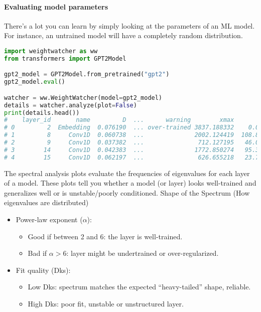 \paragraph{Evaluating model parameters}

There's a lot you can learn by simply looking at the parameters of an ML model. For instance, an untrained model will have a completely random distribution. 

\begin{lstlisting}[language=Python]
import weightwatcher as ww
from transformers import GPT2Model

gpt2_model = GPT2Model.from_pretrained("gpt2")
gpt2_model.eval()

watcher = ww.WeightWatcher(model=gpt2_model)
details = watcher.analyze(plot=False)
print(details.head())
#    layer_id       name         D  ...      warning        xmax        xmin
# 0         2  Embedding  0.076190  ... over-trained 3837.188332    0.003564
# 1         8     Conv1D  0.060738  ...              2002.124419  108.881419
# 2         9     Conv1D  0.037382  ...               712.127195   46.092445
# 3        14     Conv1D  0.042383  ...              1772.850274   95.358278
# 4        15     Conv1D  0.062197  ...               626.655218   23.727908

\end{lstlisting}
 
The spectral analysis plots evaluate the frequencies of eigenvalues for each layer of a model. These plots tell you whether a model (or layer) looks well-trained and generalizes well or is unstable/poorly conditioned.
Shape of the Spectrum (How eigenvalues are distributed)
\begin{itemize}
	\item Power-law exponent ($\alpha$):
		\begin{itemize}
			\item Good if between 2 and 6: the layer is well-trained.
			\item Bad if $\alpha > 6$: layer might be undertrained or over-regularized.
		\end{itemize}
	\item Fit quality (Dks):
		\begin{itemize}
			\item Low Dks: spectrum matches the expected ``heavy-tailed'' shape, reliable.
			\item High Dks: poor fit, unstable or unstructured layer.
		\end{itemize}
\end{itemize}

